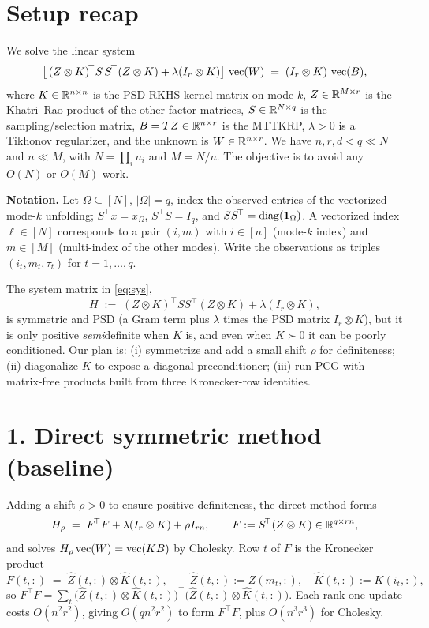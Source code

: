 \documentclass[11pt]{article}
\begin{document}
\section*{Setup recap}

We solve the linear system
\begin{equation}\label{eq:sys}
\bigl[\,(Z\otimes K)^{\!\top} S\,S^{\!\top}(Z\otimes K) + \lambda(I_r\otimes K)\bigr]\,\operatorname{vec}(W)
 \;=\; (I_r\otimes K)\,\operatorname{vec}(B),
\end{equation}
where $K\in\mathbb{R}^{n\times n}$ is the PSD RKHS kernel matrix on mode $k$,
$Z\in\mathbb{R}^{M\times r}$ is the Khatri--Rao product of the other factor matrices,
$S\in\mathbb{R}^{N\times q}$ is the sampling/selection matrix, $B=TZ\in\mathbb{R}^{n\times r}$
is the MTTKRP, $\lambda>0$ is a Tikhonov regularizer, and the unknown is
$W\in\mathbb{R}^{n\times r}$. We have $n,r,d<q\ll N$ and $n\ll M$, with
$N=\prod_i n_i$ and $M=N/n$. The objective is to avoid any $O(N)$ or $O(M)$
work.

\medskip
\noindent\textbf{Notation.} Let $\Omega\subseteq[N]$, $|\Omega|=q$, index the
observed entries of the vectorized mode-$k$ unfolding; $S^{\!\top}x=x_\Omega$,
$S^{\!\top}S=I_q$, and $SS^{\!\top}=\operatorname{diag}(\mathbf 1_\Omega)$. A vectorized index
$\ell\in[N]$ corresponds to a pair $(i,m)$ with $i\in[n]$ (mode-$k$ index) and
$m\in[M]$ (multi-index of the other modes). Write the observations as triples
$(i_t,m_t,\tau_t)$ for $t=1,\dots,q$.

The system matrix in \eqref{eq:sys},
\[
  H \;:=\; (Z\otimes K)^{\!\top}SS^{\!\top}(Z\otimes K)+\lambda(I_r\otimes K),
\]
is symmetric and PSD (a Gram term plus $\lambda$ times the PSD matrix
$I_r\otimes K$), but it is only positive \emph{semi}definite when $K$ is, and
even when $K\succ0$ it can be poorly conditioned. Our plan is: (i) symmetrize
and add a small shift $\rho$ for definiteness; (ii) diagonalize $K$ to expose a
diagonal preconditioner; (iii) run PCG with matrix-free products built from
three Kronecker-row identities.

\section*{1. Direct symmetric method (baseline)}

Adding a shift $\rho>0$ to ensure positive definiteness, the direct method
forms
\[
  H_\rho \;=\; F^{\!\top}F + \lambda(I_r\otimes K)+\rho I_{rn},
  \qquad F:=S^{\!\top}(Z\otimes K)\in\mathbb{R}^{q\times rn},
\]
and solves $H_\rho\operatorname{vec}(W)=\operatorname{vec}(KB)$ by Cholesky. Row $t$ of $F$ is the
Kronecker product
\[
  F(t,:)\;=\;\widehat Z(t,:)\otimes \widehat K(t,:),
  \qquad
  \widehat Z(t,:):=Z(m_t,:),\quad \widehat K(t,:):=K(i_t,:),
\]
so $F^{\!\top}F=\sum_t \bigl(\widehat Z(t,:)\otimes\widehat K(t,:)\bigr)^{\!\top}
\bigl(\widehat Z(t,:)\otimes\widehat K(t,:)\bigr)$. Each rank-one update costs
$O(n^2r^2)$, giving $O(qn^2r^2)$ to form $F^{\!\top}F$, plus $O(n^3r^3)$ for
Cholesky.
\end{document}
